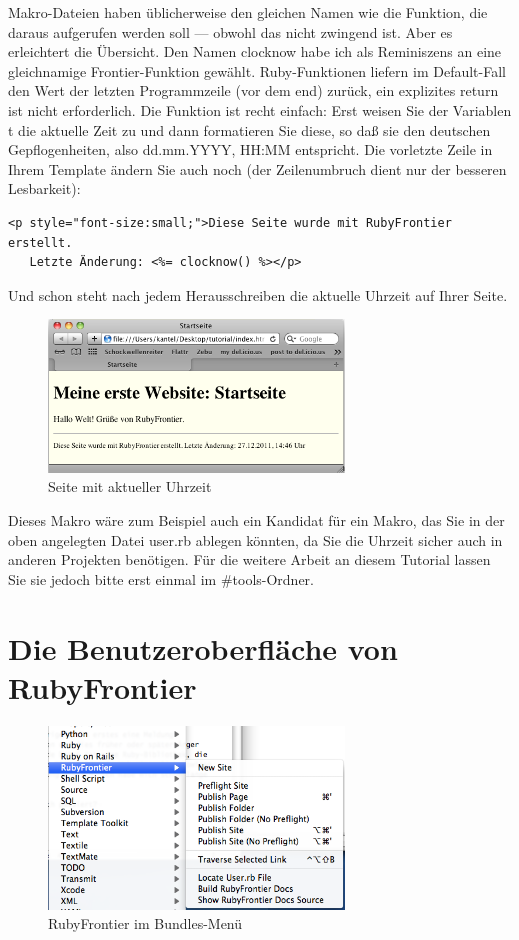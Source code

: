 \documentclass[11pt]{report}
\begin{document}
Makro-Dateien haben üblicherweise den gleichen Namen wie die Funktion,
die daraus aufgerufen werden soll — obwohl das nicht zwingend
ist. Aber es erleichtert die Übersicht. Den Namen clocknow habe ich
als Reminiszens an eine gleichnamige Frontier-Funktion
gewählt. Ruby-Funktionen liefern im Default-Fall den Wert der letzten
Programmzeile (vor dem end) zurück, ein explizites return ist nicht
erforderlich. Die Funktion ist recht einfach: Erst weisen Sie der
Variablen t die aktuelle Zeit zu und dann formatieren Sie diese, so
daß sie den deutschen Gepflogenheiten, also dd.mm.YYYY, HH:MM
entspricht. Die vorletzte Zeile in Ihrem Template ändern Sie auch noch
(der Zeilenumbruch dient nur der besseren Lesbarkeit):


\begin{verbatim}
<p style="font-size:small;">Diese Seite wurde mit RubyFrontier erstellt.
   Letzte Änderung: <%= clocknow() %></p>
\end{verbatim}

Und schon steht nach jedem Herausschreiben die aktuelle Uhrzeit auf
Ihrer Seite.

\begin{figure}[h!]
\centering
\includegraphics[width=0.7\textwidth]{./images/clocknow.png}
\caption{\label{clocknow}Seite mit aktueller Uhrzeit}
\end{figure}


Dieses Makro wäre zum Beispiel auch ein Kandidat für ein Makro, das
Sie in der oben angelegten Datei user.rb ablegen könnten, da Sie die
Uhrzeit sicher auch in anderen Projekten benötigen. Für die weitere
Arbeit an diesem Tutorial lassen Sie sie jedoch bitte erst einmal
im \#tools-Ordner.
\chapter{Die Benutzeroberfläche von RubyFrontier}
\label{sec-1-3}


\begin{figure}[h!]
\centering
\includegraphics[width=0.7\textwidth]{./images/rubyfrontier-im-bundles-menue.png}
\caption{\label{rubyfrontier-im-bundles-menue}RubyFrontier im Bundles-Menü}
\end{figure}
\end{document}
